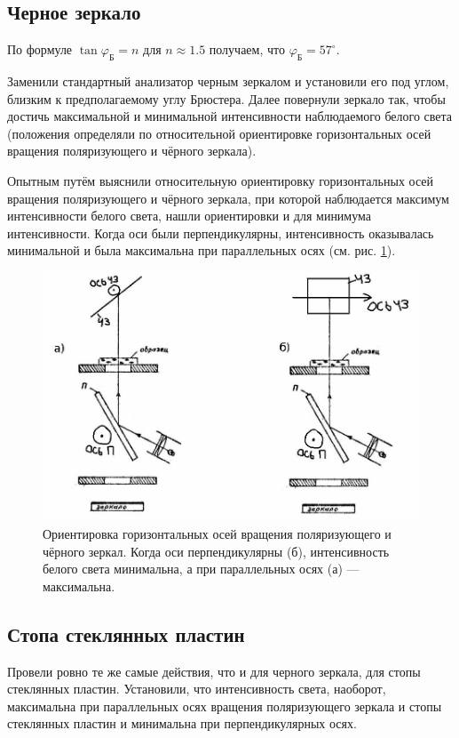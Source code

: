 \documentclass[12pt]{article}
\begin{document}
	\subsection{Черное зеркало}
	По формуле $\tan{\varphi_\text{Б}} = n$ для $n\approx1.5$ получаем, что $\varphi_\text{Б} = 57^\circ$.
	\par Заменили стандартный анализатор черным зеркалом и установили его под углом, близким к предполагаемому углу Брюстера. Далее повернули зеркало так, чтобы достичь максимальной и минимальной интенсивности наблюдаемого белого света (положения определяли по относительной ориентировке горизонтальных осей вращения поляризующего и чёрного зеркала).
	\par Опытным путём выяснили относительную ориентировку горизонтальных осей вращения поляризующего и чёрного зеркала, при которой наблюдается максимум интенсивности белого света, нашли ориентировки и для минимума интенсивности. Когда оси были перпендикулярны, интенсивность оказывалась минимальной и была максимальна при параллельных осях (см. рис. \ref{fig:4}).
	\begin{figure}[tb]
		\centering
		\includegraphics[width=1\linewidth]{../images/black_mirror}
		\caption{Ориентировка горизонтальных осей вращения поляризующего и чёрного зеркал. Когда оси перпендикулярны (б), интенсивность белого света минимальна, а при параллельных осях (а) \---- максимальна.}
		\label{fig:4}
	\end{figure}

	\subsection{Стопа стеклянных пластин}
	Провели ровно те же самые действия, что и для черного зеркала, для стопы стеклянных пластин. Установили, что интенсивность света, наоборот, максимальна при параллельных осях вращения поляризующего зеркала и стопы стеклянных пластин и минимальна при перпендикулярных осях.
\end{document}
